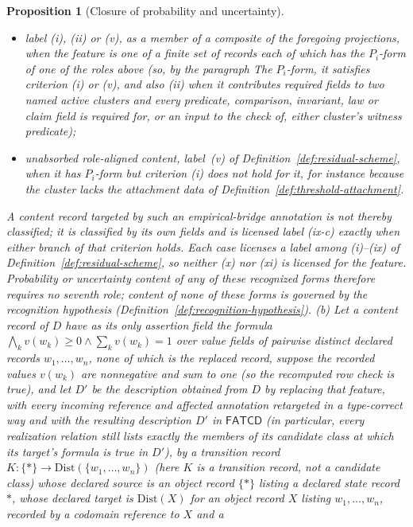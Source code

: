 \documentclass[11pt]{article}
\newtheorem{proposition}[theorem]{Proposition}
\theoremstyle{definition}
\newcommand{\FATCD}{\ensuremath{\mathsf{FATCD}}}
\begin{document}
\begin{proposition}[Closure of probability and uncertainty]
\begin{itemize}[topsep=2pt,itemsep=1pt]
  \item label (i), (ii) or (v), as a member of a composite of the foregoing
    projections, when the feature is one of a finite set of records each of which has the \(P_i\)-form of one of the roles above (so, by the paragraph
    \emph{The \(P_i\)-form}, it satisfies criterion (i) or (v), and also (ii)
    when it contributes required fields to two named active clusters and every
    predicate, comparison, invariant, law or claim field is required for, or an
    input to the check of, either cluster's witness predicate);
  \item unabsorbed role-aligned content, label~(v) of
    Definition~\ref{def:residual-scheme}, when it has \(P_i\)-form but
    criterion (i) does not hold for it, for instance because the cluster lacks
    the attachment data of Definition~\ref{def:threshold-attachment}.
\end{itemize}
A content record targeted by such an empirical-bridge annotation is not thereby classified; it is classified by its own fields and is licensed label (ix-c) exactly when either branch of that criterion holds.
Each case licenses a label among (i)--(ix) of
Definition~\ref{def:residual-scheme}, so neither (x) nor (xi) is licensed for
the feature. Probability or uncertainty content of any of these recognized forms therefore
requires no seventh role; content of none of these forms is governed by the
recognition hypothesis (Definition~\ref{def:recognition-hypothesis}).
\textup{(b)} Let a content record of \(D\) have as its only assertion field the formula \(\bigwedge_k v(w_k)\ge0\wedge\sum_k v(w_k)=1\) over value fields of pairwise distinct declared records \(w_1,\dots,w_n\), none of which is the replaced record, suppose the recorded values \(v(w_k)\) are nonnegative and sum to one (so the recomputed row check is true), and let \(D'\) be the description obtained from \(D\) by replacing that
feature, with every incoming reference and affected annotation retargeted in a
type-correct way and with the resulting description \(D'\) in \FATCD{} (in particular, every realization relation still lists exactly the members of its candidate class at which its target's formula is true in \(D'\)), by a transition record \(K:\{*\}\to\mathrm{Dist}(\{w_1,\dots,w_n\})\) (here \(K\) is a transition record, not a candidate class)
whose declared source is an object record \(\{*\}\) listing a declared state
record \(*\), whose declared target is \(\mathrm{Dist}(X)\) for an object record
\(X\) listing \(w_1,\dots,w_n\), recorded by a codomain reference to \(X\) and a

\end{proposition}
\end{document}
